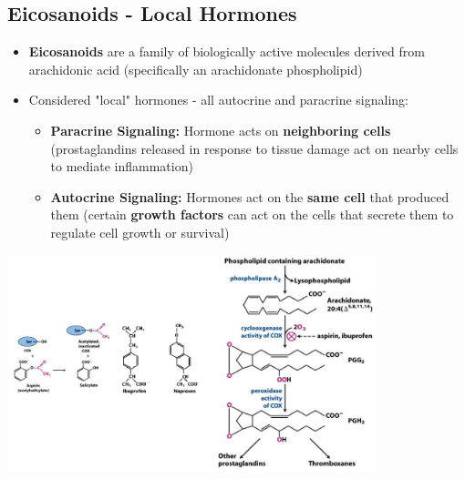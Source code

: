 \documentclass[10pt]{article}
\begin{document}
\subsection*{Eicosanoids - Local Hormones}
\begin{itemize}
    \item \textbf{Eicosanoids} are a family of biologically active molecules derived from arachidonic acid (specifically an arachidonate phospholipid)
    \item Considered "local" hormones - all autocrine and paracrine signaling:
    \begin{itemize}
        \item \textbf{Paracrine Signaling:} Hormone acts on \textbf{neighboring cells} (prostaglandins released in response to tissue damage act on nearby cells to mediate inflammation)
        \item \textbf{Autocrine Signaling:} Hormones act on the \textbf{same cell} that produced them (certain \textbf{growth factors} can act on the cells that secrete them to regulate cell growth or survival)
    \end{itemize}
\end{itemize}
\begin{center}
    \includegraphics*[width=0.8\textwidth]{L2_16.png}
\end{center}
\end{document}
